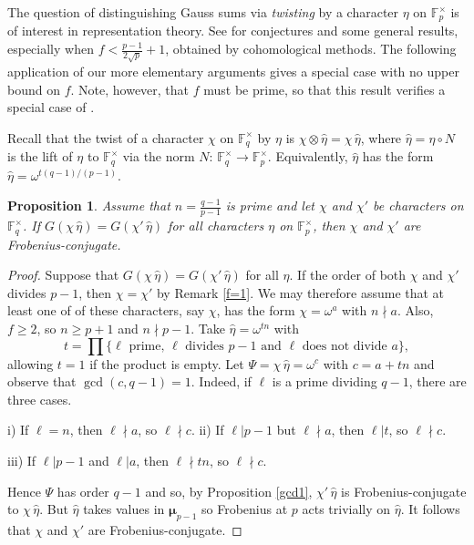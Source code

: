 \documentclass[12pt]{amsart}  \usepackage{amsmath,amssymb,enumerate,amscd,tikz,url}
\numberwithin{equation}{section}
\newtheorem{prop}[equation]{Proposition}
\theoremstyle{definition}
\newcommand{\F}{{\mathbb F}}
\newcommand{\Mu}{\boldsymbol \mu}
\begin{document}
The question of distinguishing Gauss sums via {\em twisting} by a character $\eta$ on $\F_p^\times$ is of interest in representation theory.  See \cite{NZY} for conjectures and some general results, especially when $f < \frac{p-1}{2\sqrt{p}} +1$, obtained by cohomological methods.  The following application of our more elementary arguments gives a special case with no upper bound on $f$.  Note, however, that $f$ must be prime, so that this result verifies a special case of \cite[Conjecture 2.6]{NZY}.  

Recall that the twist of a character $\chi$ on $\F_q^\times$ by $\eta$ is $\chi \otimes \widehat{\eta} = \chi \, \widehat{\eta}$, where $\widehat{\eta}  = \eta \circ N$ is the lift of $\eta$ to $\F_q^\times$ via the norm $N\!: \, \F_q^{\times} \to \F_p^{\times}$.  Equivalently, $\widehat{\eta}$ has the form $\widehat{\eta} = \omega^{t (q-1)/(p-1)}$.

\begin{prop} \label{Twist}
Assume that $n  = \frac{q-1}{p-1}$ is prime and let $\chi$ and $\chi'$ be characters on $\F_q^\times$.  If $G(\chi \, \widehat{\eta}) = G(\chi' \,  \widehat{\eta})$ for all characters $\eta$ on $\F_p^\times$, then $\chi$ and $\chi'$ are Frobenius-conjugate.
\end{prop}

\begin{proof}
Suppose that $G(\chi \, \widehat{\eta}) = G(\chi' \,  \widehat{\eta})$ for all $\eta$.  If the order of both $\chi$ and $\chi'$ divides $p-1$, then $\chi = \chi'$ by Remark \ref{f=1}.  We may therefore assume that at least one of of these characters, say $\chi$, has the form $\chi = \omega^a$ with $n \nmid a$.  Also, $f \ge 2$, so $n \ge p+1$ and $n \nmid p-1$.    Take $\widehat{\eta} = \omega^{tn}$ with 
$$ 
t = \prod \{ \ell \text{ prime}, \, \ell \text{ divides } p-1 \text{ and } \ell \text{ does not divide } a \},
$$ 
allowing $t=1$ if the product is empty.  Let $\Psi = \chi \, \widehat{\eta} = \omega^c$ with $c = a + tn$ and observe that $\gcd(c,q-1) = 1$. Indeed, if $\ell$ is a prime dividing $q-1$, there are three cases. \vspace{2 pt}

\noindent \hspace{9 pt} i)  If $\ell = n$, then $\ell \nmid a$, so $\ell \nmid c$.  \hspace{7 pt} ii) If $\ell \vert p-1$ but $\ell  \nmid a$, then $\ell \vert t$, so $\ell \nmid c$.   \vspace{2 pt}

\noindent \hspace{3 pt} iii) If $\ell \vert p-1$ and $\ell \vert a$, then $\ell \nmid tn$, so $\ell \nmid c$. \vspace{2 pt}

\noindent Hence $\Psi$ has order $q-1$ and so, by Proposition \ref{gcd1}, $\chi' \, \widehat{\eta}$ is Frobenius-conjugate to $\chi \, \widehat{\eta}$.  But $\widehat{\eta}$ takes values in $\Mu_{p-1}$ so Frobenius at $p$ acts trivially on $\widehat{\eta}$.  It follows that $\chi$ and $\chi'$ are Frobenius-conjugate.
\end{proof}
\end{document}
